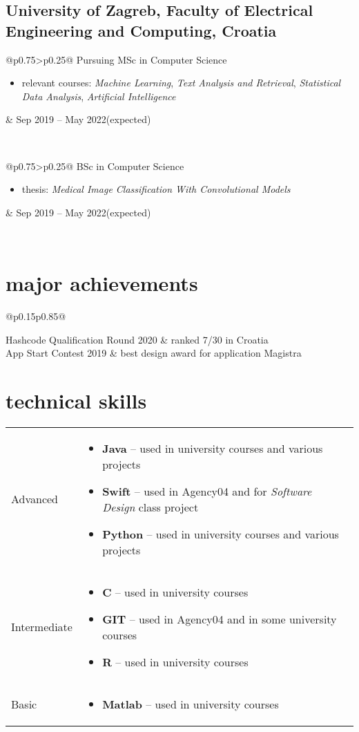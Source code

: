 \documentclass[a4paper]{article}
\makeatletter
\newlength{\tablewidth}
\newenvironment{period}[2]{%
\newcommand{\sarma}{#2}%
\setlength{\tablewidth}{\linewidth}
\addtolength{\tablewidth}{-2\tabcolsep}
\begin{tabular}{@{}p{0.75\tablewidth}>{\raggedleft\arraybackslash}p{0.25\tablewidth}@{}}%
#1 \newline
\begin{itemize}
}{%
\end{itemize} & \sarma \\%
\end{tabular}\\
}
\newenvironment{skills}{%
\setlength{\tablewidth}{\linewidth}
\addtolength{\tablewidth}{-2\tabcolsep}
\begin{tabular}{@{}p{0.15\tablewidth}p{0.85\tablewidth}@{}}
}{%
\end{tabular}
}
\makeatother
\begin{document}
\subsection{University of Zagreb, Faculty of Electrical Engineering and Computing, Croatia}
\begin{period}{Pursuing MSc in Computer Science}{Sep 2019 -- May 2022\linebreak(expected)}
    \item relevant courses:
        \textit{Machine Learning},
        \textit{Text Analysis and Retrieval},
        \textit{Statistical Data Analysis},
        \textit{Artificial Intelligence}
\end{period}
\begin{period}{BSc in Computer Science}{Sep 2016 -- Jul 2019}
    \item thesis:
        \textit{Medical Image Classification With Convolutional Models}
\end{period}

\section{major achievements}
\begin{skills}
    Hashcode Qualification Round 2020 &   ranked 7/30 in Croatia\\
    App Start Contest 2019 &  best design award for application Magistra
\end{skills}

\section{technical skills}
\begin{skills}
    Advanced &
    \begin{itemize}
        \item \textbf{Java} -- used in university courses and various projects
        \item \textbf{Swift} -- used in Agency04 and for \textit{Software Design} class project
        \item \textbf{Python} -- used in university courses and various projects
    \end{itemize} \\
    Intermediate &
    \begin{itemize}
        \item \textbf{C} -- used in university courses
        \item \textbf{GIT} -- used in Agency04 and in some university courses
        \item \textbf{R} -- used in university courses
    \end{itemize} \\
    Basic &
    \begin{itemize}
        \item \textbf{Matlab} -- used in university courses
    \end{itemize} \\
\end{skills}
\end{document}
